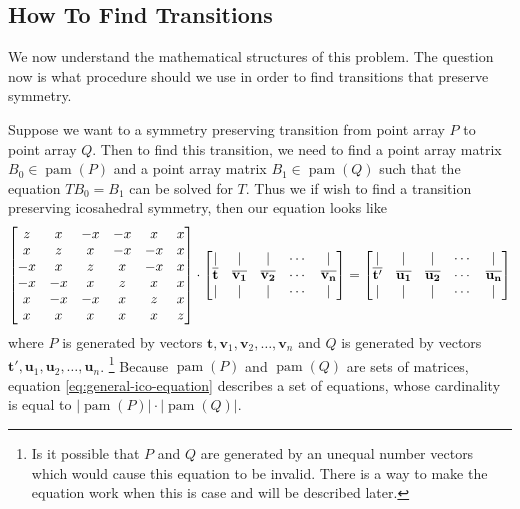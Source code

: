 \documentclass[a4paper,10pt]{article}
\let\oldfootnote\footnote
\renewcommand{\footnote}{\unskip\oldfootnote}
\theoremstyle{plain}
\theoremstyle{definition}
\theoremstyle{remark}
\renewcommand{\vec}[1]{\mathbf{#1}}
\newcommand\abs[1]{\left|#1\right|}
\DeclareMathOperator{\pam}{pam}
\begin{document}
\subsection{How To Find Transitions}
We now understand the mathematical structures of this problem.
The question now is what procedure should we use in order to find transitions that preserve symmetry.

Suppose we want to a symmetry preserving transition from point array \( P \) to point array \( Q \).
Then to find this transition, we need to find a point array matrix \( B_0 \in \pam(P) \) and a point array matrix \( B_1 \in \pam(Q) \) such that the equation \( TB_0 = B_1 \) can be solved for \( T \).
Thus we if wish to find a transition preserving icosahedral symmetry, then our equation looks like
\begin{equation}
	\begin{bmatrix}
		z  & x  & -x & -x & x  & x \\
		x  & z  & x  & -x & -x & x \\
		-x & x  & z  & x  & -x & x \\
		-x & -x & x  & z  & x  & x \\
		x  & -x & -x & x  & z  & x \\
		x  & x  & x  & x  & x  & z
	\end{bmatrix}
	\cdot
	\begin{bmatrix}
		| & | & | & \cdots & | \\
		\icobar{t} & \icobar{v_1} & \icobar{v_2} & \cdots & \icobar{v_n} \\
		| & | & | & \cdots & |
	\end{bmatrix}
	=
	\begin{bmatrix}
		| & | & | & \cdots & | \\
		\icobar{t'} & \icobar{u_1} & \icobar{u_2} & \cdots & \icobar{u_n} \\
		| & | & | & \cdots & |
	\end{bmatrix}
	\label{eq:general-ico-equation}
\end{equation}
where \( P \) is generated by vectors \(\vec{t}, \vec{v}_1, \vec{v}_2, \dots, \vec{v}_n\) and \( Q \) is generated by vectors \(\vec{t'}, \vec{u}_1, \vec{u}_2, \dots, \vec{u}_n\).
\footnote{
	Is it possible that \( P \) and \( Q \) are generated by an unequal number vectors which would cause this equation to be invalid. 
	There is a way to make the equation work when this is case and will be described later.
	}
Because \( \pam(P) \) and \( \pam(Q) \) are sets of matrices, equation \ref{eq:general-ico-equation} describes a set of equations, whose cardinality is equal to \( \abs{\pam(P)}\cdot\abs{\pam(Q)}\).
\end{document}
